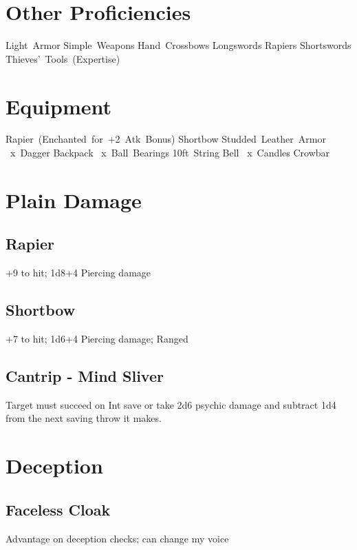 \documentclass{article}
\begin{document}
\section*{Other Proficiencies}
\raggedright
\mbox{\textbullet\quad Light Armor\quad}
\mbox{\textbullet\quad Simple Weapons\quad}
\mbox{\textbullet\quad Hand Crossbows\quad}
\mbox{\textbullet\quad Longswords\quad}
\mbox{\textbullet\quad Rapiers\quad}
\mbox{\textbullet\quad Shortswords\quad}
\mbox{\textbullet\quad Thieves' Tools (Expertise)\quad}
\section*{Equipment}
\raggedright
\mbox{\textbullet\quad Rapier (Enchanted for +2 Atk Bonus)\quad}
\mbox{\textbullet\quad Shortbow\quad}
\mbox{\textbullet\quad Studded Leather Armor\quad}
\mbox{\textbullet{} x Dagger\quad}
\mbox{\textbullet\quad Backpack\quad}
\mbox{\textbullet{} x Ball Bearings\quad}
\mbox{\textbullet\quad 10ft String\quad}
\mbox{\textbullet\quad Bell\quad}
\mbox{\textbullet{} x Candles\quad}
\mbox{\textbullet\quad Crowbar\quad}
\clearpage
\thispagestyle{empty}
\mbox{}
\clearpage
\twocolumn
\setcounter{page}{1}
\section{Plain Damage}
\subsection*{\phantom{1.1}\quad Rapier}
+9 to hit; 1d8+4 Piercing damage

\subsection*{\phantom{1.1}\quad Shortbow}
+7 to hit; 1d6+4 Piercing damage; Ranged

\subsection{Cantrip - Mind Sliver}
Target must succeed on Int save or take 2d6 psychic damage and subtract 1d4 from the next saving throw it makes.

\section{Deception}
\subsection{Faceless Cloak}
Advantage on deception checks; can change my voice
\end{document}
